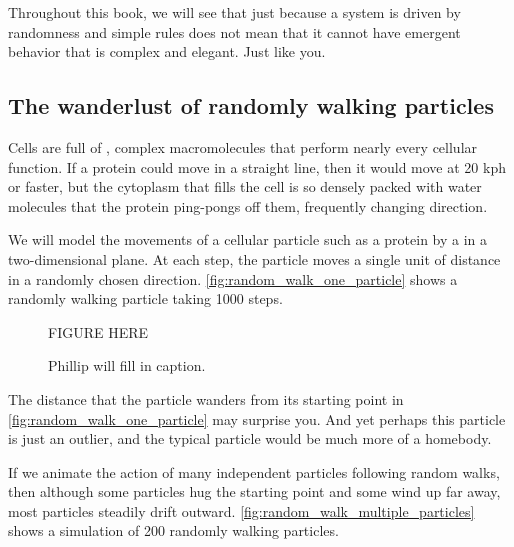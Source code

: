 Throughout this book, we will see that just because a system is driven by randomness and simple rules does not mean that it cannot have emergent behavior that is complex and elegant. Just like you.

\FloatBarrier
{}
\subsection{The wanderlust of randomly walking particles}

Cells are full of , complex macromolecules that perform nearly every cellular function. If a protein could move in a straight line, then it would move at 20 kph or faster, but the cytoplasm that fills the cell is so densely packed with water molecules that the protein ping-pongs off them, frequently changing direction.

We will model the movements of a cellular particle such as a protein by a  in a two-dimensional plane. At each step, the particle moves a single unit of distance in a randomly chosen direction. \autoref{fig:random_walk_one_particle} shows a randomly walking particle taking 1000 steps.\\

\begin{figure}[h]
\centering
\mySfFamily
FIGURE HERE
\caption{Phillip will fill in caption.}
\label{fig:random_walk_one_particle}
\end{figure}

The distance that the particle wanders from its starting point in \autoref{fig:random_walk_one_particle} may surprise you. And yet perhaps this particle is just an outlier, and the typical particle would be much more of a homebody.


If we animate the action of many independent particles following random walks, then although some particles hug the starting point and some wind up far away, most particles steadily drift outward. \autoref{fig:random_walk_multiple_particles} shows a simulation of 200 randomly walking particles.\\

